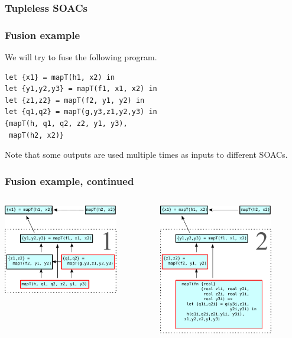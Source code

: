 \documentclass{beamer}
\begin{document}
\begin{frame}
  \frametitle{Tupleless SOACs}
\end{frame}

\begin{frame}[fragile]
  \frametitle{Fusion example}

  We will try to fuse the following program.

  \begin{lstlisting}
let {x1} = mapT(h1, x2) in
let {y1,y2,y3} = mapT(f1, x1, x2) in
let {z1,z2} = mapT(f2, y1, y2) in
let {q1,q2} = mapT(g,y3,z1,y2,y3) in
{mapT(h, q1, q2, z2, y1, y3),
 mapT(h2, x2)}
\end{lstlisting}

Note that some outputs are used multiple times as inputs to different
SOACs.

\end{frame}

\begin{frame}[t]
  \frametitle{Fusion example, continued}

  \centering
  \begin{columns}
    \begin{column}[T]{0.48\textwidth}
      \includegraphics[width=5cm]{img/fusion-1.pdf}
    \end{column}\hfill
    \begin{column}[T]{0.48\textwidth}
      \includegraphics[width=5cm]{img/fusion-2.pdf}
    \end{column}
  \end{columns}

\end{frame}
\end{document}
